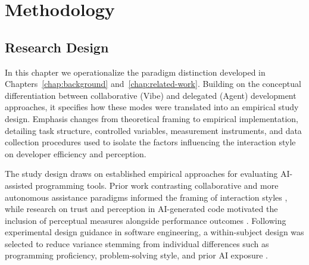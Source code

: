 \chapter{Methodology} %
\label{chap:methodology}

\section{Research Design} %

\label{sec:research-design}







In this chapter we operationalize the paradigm distinction developed in Chapters~\ref{chap:background} and~\ref{chap:related-work}. Building on the conceptual differentiation between collaborative (Vibe) and delegated (Agent) development approaches, it specifies how these modes were translated into an empirical study design. Emphasis changes from theoretical framing to empirical implementation, detailing task structure, controlled variables, measurement instruments, and data collection procedures used to isolate the factors influencing the interaction style on developer efficiency and perception.

The study design draws on established empirical approaches for evaluating AI-assisted programming tools. Prior work contrasting collaborative and more autonomous assistance paradigms informed the framing of interaction styles \parencite[p.~5]{sarkar2025codewithme}, while research on trust and perception in AI-generated code motivated the inclusion of perceptual measures alongside performance outcomes \parencite[pp.~3--5]{barke2023trust}. Following experimental design guidance in software engineering, a within-subject design was selected to reduce variance stemming from individual differences such as programming proficiency, problem-solving style, and prior AI exposure \parencite{wohlin2012experimentation}.

